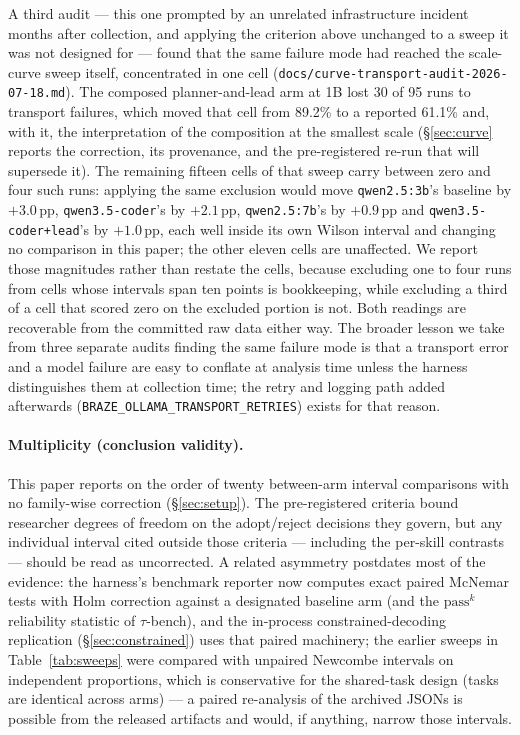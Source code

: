\documentclass[smallcondensed,natbib]{svjour3}
\begin{document}
A third audit --- this one prompted by an unrelated infrastructure
incident months after collection, and applying the criterion above
unchanged to a sweep it was not designed for --- found that the same
failure mode had reached the scale-curve sweep itself, concentrated in
one cell (\texttt{docs/curve-transport-audit-2026-07-18.md}). The
composed planner-and-lead arm at 1B lost 30 of 95 runs to transport
failures, which moved that cell from 89.2\% to a reported 61.1\% and,
with it, the interpretation of the composition at the smallest scale
(\S\ref{sec:curve} reports the correction, its provenance, and the
pre-registered re-run that will supersede it). The remaining fifteen
cells of that sweep carry between zero and four such runs: applying the
same exclusion would move \texttt{qwen2.5:3b}'s baseline by
$+3.0$\,pp, \texttt{qwen3.5-coder}'s by $+2.1$\,pp,
\texttt{qwen2.5:7b}'s by $+0.9$\,pp and \texttt{qwen3.5-coder+lead}'s
by $+1.0$\,pp, each well inside its own Wilson interval and changing no
comparison in this paper; the other eleven cells are unaffected. We
report those magnitudes rather than restate the cells, because
excluding one to four runs from cells whose intervals span ten points
is bookkeeping, while excluding a third of a cell that scored zero on
the excluded portion is not. Both readings are recoverable from the
committed raw data either way. The broader lesson we take from three
separate audits finding the same failure mode is that a transport
error and a model failure are easy to conflate at analysis time unless
the harness distinguishes them at collection time; the retry and
logging path added afterwards
(\texttt{BRAZE\_OLLAMA\_TRANSPORT\_RETRIES}) exists for that reason.

\paragraph{Multiplicity (conclusion validity).} This paper reports on
the order of twenty between-arm interval comparisons with no
family-wise correction (\S\ref{sec:setup}). The pre-registered
criteria bound researcher degrees of freedom on the adopt/reject
decisions they govern, but any individual interval cited outside those
criteria --- including the per-skill contrasts --- should be read as
uncorrected. A related asymmetry postdates most of the evidence: the
harness's benchmark reporter now computes exact paired McNemar tests
with Holm correction against a designated baseline arm (and the
$\text{pass}^k$ reliability statistic of $\tau$-bench), and the
in-process constrained-decoding replication (\S\ref{sec:constrained})
uses that paired machinery; the earlier sweeps in
Table~\ref{tab:sweeps} were compared with unpaired
Newcombe intervals on independent proportions, which is conservative
for the shared-task design (tasks are identical across arms) --- a
paired re-analysis of the archived JSONs is possible from the released
artifacts and would, if anything, narrow those intervals.
\end{document}
